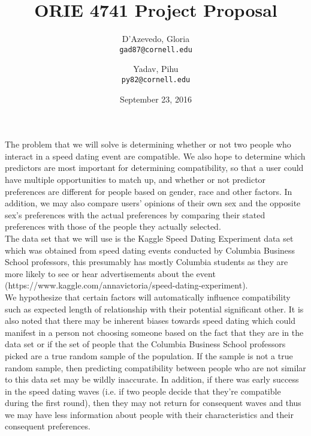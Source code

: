 \documentclass{article}
\title{ORIE 4741 Project Proposal}
\author{
  D'Azevedo, Gloria\\
  \texttt{gad87@cornell.edu}
  \and
  Yadav, Pihu\\
  \texttt{py82@cornell.edu}
}
\date{September 23, 2016}
\begin{document}
\maketitle

The problem that we will solve is determining whether or not two people who interact in a speed dating event are compatible. We also hope to determine which predictors are most important for determining compatibility, so that a user could have multiple opportunities to match up, and whether or not predictor preferences are different for people based on gender, race and other factors. In addition, we may also compare users’ opinions of their own sex and the opposite sex’s preferences with the actual preferences by comparing their stated preferences with those of the people they actually selected. \\

The data set that we will use is the Kaggle Speed Dating Experiment data set which was obtained from speed dating events conducted by Columbia Business School professors, this presumably has mostly Columbia students as they are more likely to see or hear advertisements about the event \\ 
    (https://www.kaggle.com/annavictoria/speed-dating-experiment). \\

We hypothesize that certain factors will automatically influence compatibility such as expected length of relationship with their potential significant other.  It is also noted that there may be inherent biases towards speed dating which could manifest in a person not choosing someone based on the fact that they are in the data set or if the set of people that the Columbia Business School professors picked are a true random sample of the population.  If the sample is not a true random sample, then predicting compatibility between people who are not similar to this data set may be wildly inaccurate.  In addition, if there was early success in the speed dating waves (i.e. if two people decide that they’re compatible during the first round), then they may not return for consequent waves and thus we may have less information about people with their characteristics and their consequent preferences.\\
\end{document}
